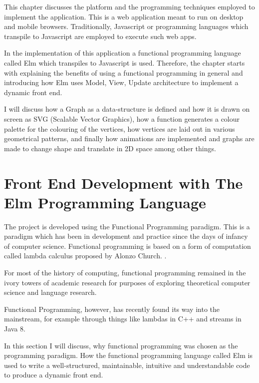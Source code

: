 \graphicspath{ {images/} }

This chapter discusses the platform and the programming techniques employed to
implement the application.  This is a web application meant to run
on desktop and mobile browsers. Traditionally, Javascript or programming languages which transpile
to Javascript are employed to execute such web apps. 

In the implementation of this application a functional programming language
called Elm which transpiles to Javascript is used. Therefore, the chapter
starts with explaining the benefits of using a functional programming in general
and introducing how Elm uses Model, View, Update architecture to implement a dynamic
front end.

I will discuss how a Graph as a
data-structure is defined and how it is drawn on screen as SVG (Scalable Vector
Graphics), how a function generates a colour palette for the colouring of the
vertices, how vertices are laid out in various geometrical patterns, and finally how
animations are implemented and graphs are made to change shape and translate in
2D space among other things.


\section{Front End Development with The Elm Programming Language}

The project is developed using the Functional Programming paradigm. This is a
paradigm which has been in development and practice since the days of infancy
of computer science. Functional programming is based on a form of computation
called lambda calculus proposed by Alonzo Church. \citep{Hudak2007}.

For most of the history of computing, functional programming remained in the
ivory towers of academic research for purposes of exploring theoretical computer
science and language research.

Functional Programming, however, has recently found its way into the
mainstream, for example through things like lambdas in C++ and streams in Java 8.


In this section I will discuss, why functional programming was chosen as the
programming paradigm. How the functional programming language called
Elm is used to write a well-structured, maintainable, intuitive and
understandable code to produce a dynamic front end.

